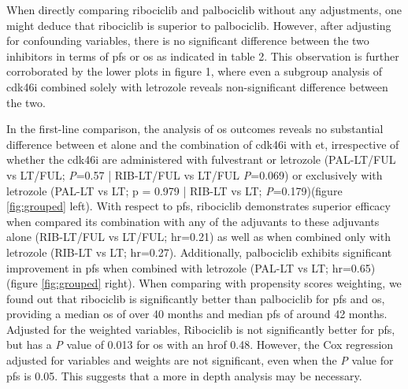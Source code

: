 When directly comparing ribociclib and palbociclib without any adjustments, one might deduce that ribociclib is superior to palbociclib. However, after adjusting for confounding variables, there is no significant difference between the two inhibitors in terms of \ac{pfs} or \ac{os} as indicated in table 2. This observation is further corroborated by the lower plots in figure 1, where even a subgroup analysis of \ac{cdk46i} combined solely with letrozole reveals non-significant difference between the two.

In the first-line comparison, the analysis of \ac{os} outcomes reveals no substantial difference between \ac{et} alone and the combination of \ac{cdk46i} with \ac{et}, irrespective of whether the \ac{cdk46i} are administered with fulvestrant or letrozole  (PAL-LT/FUL vs LT/FUL; \textit{P}=0.57 | RIB-LT/FUL vs LT/FUL \textit{P}=0.069) or exclusively with letrozole (PAL-LT vs LT; p = 0.979 | RIB-LT vs LT; \textit{P}=0.179)(figure \ref{fig:grouped} left). With respect to \ac{pfs}, ribociclib demonstrates superior efficacy when compared its combination with any of the adjuvants to these adjuvants alone (RIB-LT/FUL vs LT/FUL; \ac{hr}=0.21) as well as when combined only with letrozole (RIB-LT vs LT; \ac{hr}=0.27). Additionally, palbociclib exhibits significant improvement in \ac{pfs} when combined with letrozole  (PAL-LT vs LT; \ac{hr}=0.65) (figure \ref{fig:grouped} right).
When comparing with propensity scores weighting, we found out that ribociclib is significantly better than palbociclib for \ac{pfs} and \ac{os}, providing a median \ac{os} of over 40 months and median \ac{pfs} of around 42 months. Adjusted for the weighted variables, Ribociclib is not significantly better for \ac{pfs}, but has a \textit{P} value of 0.013 for \ac{os} with an \ac{hr}of 0.48. However, the Cox regression adjusted for variables and weights are not significant, even when the \textit{P} value for \ac{pfs} is 0.05. This suggests that a more in depth analysis may be necessary.


